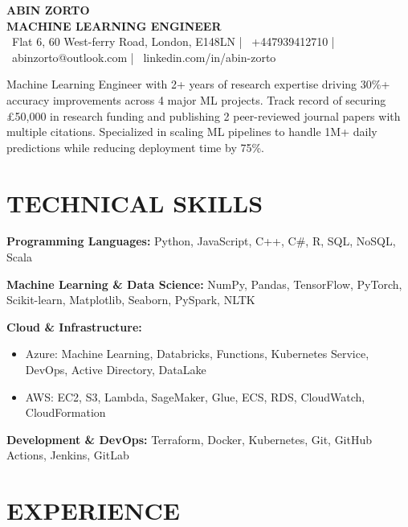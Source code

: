 \documentclass[10pt,a4paper]{article}
\begin{document}

\begin{center}
    {\color{primary}\Large\textbf{ABIN ZORTO}}\\[0.2em]
    {\color{secondary}\large\textbf{MACHINE LEARNING ENGINEER}}\\[0.3em]
    
    \small\color{secondary}
    \faMapMarker\ Flat 6, 60 West-ferry Road, London, E148LN |
    \faMobile\ +447939412710 |
    \faEnvelope\ abinzorto@outlook.com |
    \faLinkedin\ linkedin.com/in/abin-zorto
\end{center}

{\color{secondary}
Machine Learning Engineer with 2+ years of research expertise driving 30\%+ accuracy improvements across 4 major ML projects. Track record of securing £50,000 in research funding and publishing 2 peer-reviewed journal papers with multiple citations. Specialized in scaling ML pipelines to handle 1M+ daily predictions while reducing deployment time by 75\%.
}

\section*{TECHNICAL SKILLS}
\textbf{Programming Languages:} Python, JavaScript, C++, C\#, R, SQL, NoSQL, Scala

\textbf{Machine Learning \& Data Science:} NumPy, Pandas, TensorFlow, PyTorch, Scikit-learn, Matplotlib, Seaborn, PySpark, NLTK

\textbf{Cloud \& Infrastructure:}
\begin{itemize}
    \item Azure: Machine Learning, Databricks, Functions, Kubernetes Service, DevOps, Active Directory, DataLake
    \item AWS: EC2, S3, Lambda, SageMaker, Glue, ECS, RDS, CloudWatch, CloudFormation
\end{itemize}

\textbf{Development \& DevOps:} Terraform, Docker, Kubernetes, Git, GitHub Actions, Jenkins, GitLab
\section*{EXPERIENCE}
\end{document}
